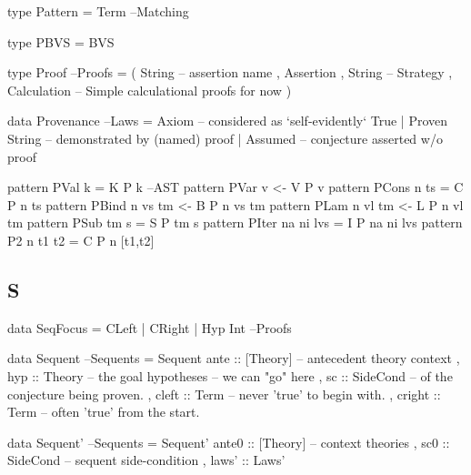 \begin{code}
type Pattern = Term                                                 --Matching
\end{code}

\begin{code}
type PBVS = BVS
\end{code}

\begin{code}
type Proof                                                            --Proofs
  = ( String -- assertion name
    , Assertion
    , String -- Strategy
    , Calculation -- Simple calculational proofs for now
    )
\end{code}

\begin{code}
data Provenance                                                         --Laws
  = Axiom          --  considered as `self-evidently` True
  | Proven String  --  demonstrated by (named) proof
  | Assumed        --  conjecture asserted w/o proof
\end{code}

\begin{code}
pattern PVal k             =  K P k                                      --AST
pattern PVar v            <-  V P v
pattern PCons n ts         =  C P n ts
pattern PBind n vs tm     <-  B P n vs tm
pattern PLam n vl tm      <-  L P n vl tm
pattern PSub tm s          =  S P tm s
pattern PIter na ni lvs    =  I P na ni lvs
pattern P2   n t1 t2       =  C P n [t1,t2]
\end{code}

\subsection{S}

\begin{code}
data SeqFocus = CLeft | CRight | Hyp Int                              --Proofs
\end{code}

\begin{code}
data Sequent                                                        --Sequents
  = Sequent {
     ante :: [Theory] -- antecedent theory context
   , hyp :: Theory -- the goal hypotheses -- we can "go" here
   , sc :: SideCond -- of the conjecture being proven.
   , cleft :: Term -- never 'true' to begin with.
   , cright :: Term -- often 'true' from the start.
   }
\end{code}

\begin{code}
data Sequent'                                                       --Sequents
  = Sequent' {
      ante0 :: [Theory] -- context theories
    , sc0       :: SideCond -- sequent side-condition
    , laws'     :: Laws'
    }
\end{code}

